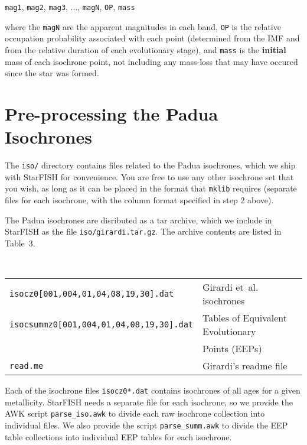\documentclass[12pt]{book}
\def\ttg{\tt\color{DarkGreen}}
\def\tto{\tt\color{myOrange}}
\begin{document}
\begin{enumerate}
\medskip\noindent
{\tto mag1}, {\tto mag2}, {\tto mag3}, ..., {\tto magN}, {\tto OP}, 
{\tto mass}

\medskip
where the {\tto magN} are the apparent magnitudes in each band, 
{\tto OP} is the relative occupation probability associated with each 
point (determined from the IMF and from the relative duration of each 
evolutionary stage), and {\tto mass} is the {\bf initial} mass of each 
isochrone point, not including any mass-loss that may have occured 
since the star was formed.
\end{enumerate}

\clearpage

\section{Pre-processing the Padua Isochrones}\label{sec:iso}

The {\ttg iso/} directory contains files related to the Padua 
isochrones, which we ship with StarFISH for convenience.  You are free 
to use any other isochrone set that you wish, as long as it can be 
placed in the format that {\ttg mklib} requires (separate files for 
each isochrone, with the column format specified in step 2 above).

The Padua isochrones are disributed as a tar archive, which we include 
in StarFISH as the file {\ttg iso/girardi.tar.gz}.  The archive contents 
are listed in Table~3.

\bigskip
{} \\
\begin{tabular}{|l|l|}
\hline 
{\ttg isocz0[001,004,01,04,08,19,30].dat} &  Girardi et~al. isochrones\\
{\ttg isocsummz0[001,004,01,04,08,19,30].dat} &  Tables of Equivalent 
    Evolutionary \\
    & Points (EEPs) \\ 
{\ttg read.me} &  Girardi's readme file\\ 
\hline
\end{tabular}

\vspace{3em}
Each of the isochrone files {\ttg isocz0*.dat} contains isochrones of 
all ages for a given metallicity.  StarFISH needs a separate file for 
each isochrone, so we provide the AWK script {\ttg parse\_iso.awk} to 
divide each raw isochrone collection into individual files.  We also 
provide the script {\ttg parse\_summ.awk} to divide the EEP table 
collections into individual EEP tables for each isochrone.
\end{document}
